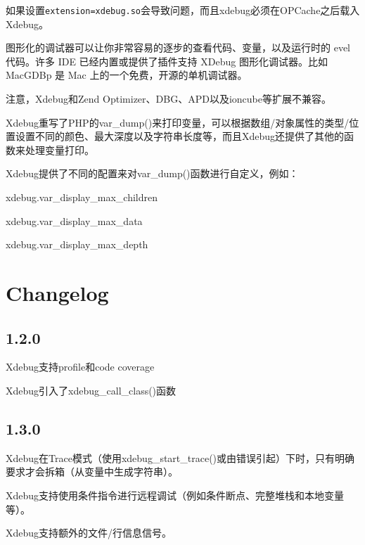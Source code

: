 如果设置\texttt{extension=xdebug.so}会导致问题，而且xdebug必须在OPCache之后载入Xdebug。

图形化的调试器可以让你非常容易的逐步的查看代码、变量，以及运行时的 evel 代码。许多 IDE 已经内置或提供了插件支持 XDebug 图形化调试器。比如 MacGDBp 是 Mac 上的一个免费，开源的单机调试器。

注意，Xdebug和Zend Optimizer、DBG、APD以及ioncube等扩展不兼容。



Xdebug重写了PHP的var\_dump()来打印变量，可以根据数组/对象属性的类型/位置设置不同的颜色、最大深度以及字符串长度等，而且Xdebug还提供了其他的函数来处理变量打印。


Xdebug提供了不同的配置来对var\_dump()函数进行自定义，例如：

\begin{compactitem}
\item xdebug.var\_display\_max\_children
\item xdebug.var\_display\_max\_data
\item xdebug.var\_display\_max\_depth
\end{compactitem}







\section{Changelog}






\subsection{1.2.0}

\begin{compactitem}
\item Xdebug支持profile和code coverage
\item Xdebug引入了xdebug\_call\_class()函数
\end{compactitem}

\subsection{1.3.0}

\begin{compactitem}
\item Xdebug在Trace模式（使用xdebug\_start\_trace()或由错误引起）下时，只有明确要求才会拆箱（从变量中生成字符串）。
\item Xdebug支持使用条件指令进行远程调试（例如条件断点、完整堆栈和本地变量等）。
\item Xdebug支持额外的文件/行信息信号。
\end{compactitem}

